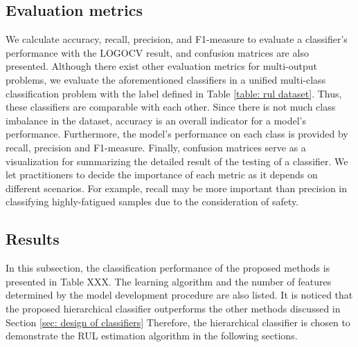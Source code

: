 \subsection{Evaluation metrics}
We calculate accuracy, recall, precision, and F1-measure to evaluate a classifier's performance with the LOGOCV result, and confusion matrices are also presented. Although there exist other evaluation metrics for multi-output problems, we evaluate the aforementioned classifiers in a unified multi-class classification problem with the label defined in Table \ref{table: rul dataset}. Thus, these classifiers are comparable with each other. Since there is not much class imbalance in the dataset, accuracy is an overall indicator for a model's performance. Furthermore, the model's performance on each class is provided by recall, precision and F1-measure. Finally, confusion matrices serve as a visualization for summarizing the detailed result of the testing of a classifier. We let practitioners to decide the importance of each metric as it depends on different scenarios. For example, recall may be more important than precision in classifying highly-fatigued samples due to the consideration of safety.

\subsection{Results}
In this subsection, the classification performance of the proposed methods is presented in Table XXX. 
The learning algorithm and the number of features determined by the model development procedure are also listed. It is noticed that the proposed hierarchical classifier outperforms the other methods discussed in Section \ref{sec: design of classifiers} 
Therefore, the hierarchical classifier is chosen to demonstrate the RUL estimation algorithm in the following sections.

